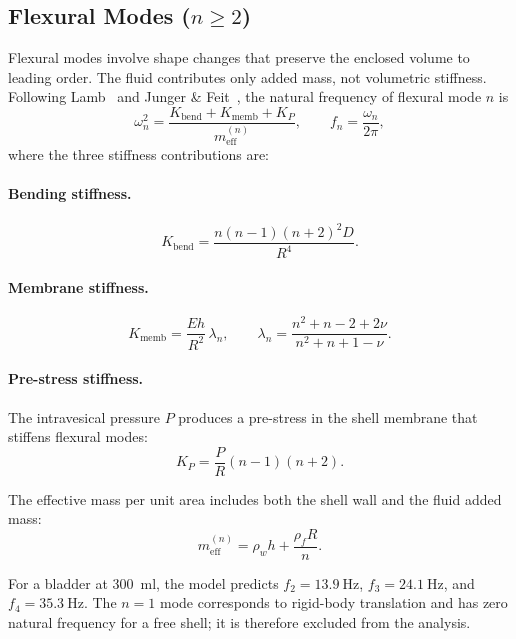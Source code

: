 \subsection{Flexural Modes ($n \geq 2$)}
\label{sec:flexural}

Flexural modes involve shape changes that preserve the enclosed volume to
leading order.  The fluid contributes only added mass, not volumetric
stiffness.  Following Lamb~\cite{lamb1882} and Junger \&
Feit~\cite{Junger1986}, the natural frequency of flexural mode $n$ is
\begin{equation}\label{eq:fn}
  \omega_n^2 = \frac{K_\mathrm{bend} + K_\mathrm{memb} + K_P}
                    {m_\mathrm{eff}^{(n)}},
  \qquad f_n = \frac{\omega_n}{2\pi},
\end{equation}
where the three stiffness contributions are:

\paragraph{Bending stiffness.}
\begin{equation}\label{eq:Kbend}
  K_\mathrm{bend} = \frac{n(n-1)(n+2)^2 D}{R^4}.
\end{equation}

\paragraph{Membrane stiffness.}
\begin{equation}\label{eq:Kmemb}
  K_\mathrm{memb} = \frac{Eh}{R^2}\,\lambda_n,
  \qquad \lambda_n = \frac{n^2 + n - 2 + 2\nu}{n^2 + n + 1 - \nu}.
\end{equation}

\paragraph{Pre-stress stiffness.}
The intravesical pressure $P$ produces a pre-stress in the shell membrane
that stiffens flexural modes:
\begin{equation}\label{eq:Kpre}
  K_P = \frac{P}{R}(n-1)(n+2).
\end{equation}

The effective mass per unit area includes both the shell wall and the fluid
added mass:
\begin{equation}\label{eq:meff}
  m_\mathrm{eff}^{(n)} = \rho_w h + \frac{\rho_f R}{n}.
\end{equation}

For a bladder at \SI{300}{\milli\litre}, the model predicts
$f_2 = \SI{13.9}{\hertz}$, $f_3 = \SI{24.1}{\hertz}$, and
$f_4 = \SI{35.3}{\hertz}$.  The $n = 1$ mode corresponds to rigid-body
translation and has zero natural frequency for a free shell; it is therefore
excluded from the analysis.


